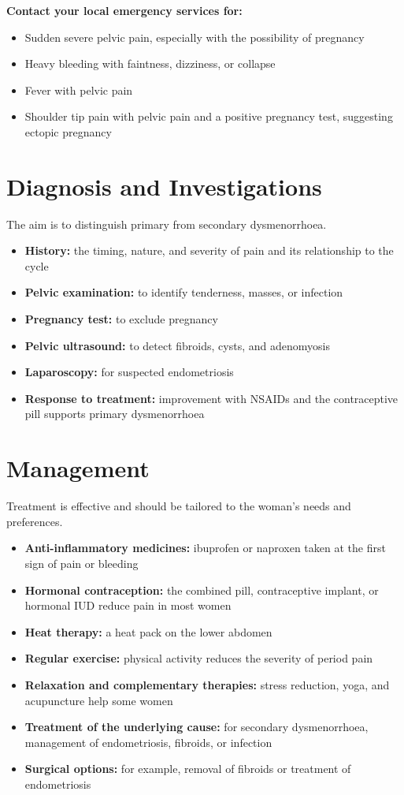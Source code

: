 \textbf{Contact your local emergency services for:}
\begin{itemize}
    \item Sudden severe pelvic pain, especially with the possibility of pregnancy
    \item Heavy bleeding with faintness, dizziness, or collapse
    \item Fever with pelvic pain
    \item Shoulder tip pain with pelvic pain and a positive pregnancy test, suggesting ectopic pregnancy
\end{itemize}

\section*{Diagnosis and Investigations}
The aim is to distinguish primary from secondary dysmenorrhoea.
\begin{itemize}
    \item \textbf{History:} the timing, nature, and severity of pain and its relationship to the cycle
    \item \textbf{Pelvic examination:} to identify tenderness, masses, or infection
    \item \textbf{Pregnancy test:} to exclude pregnancy
    \item \textbf{Pelvic ultrasound:} to detect fibroids, cysts, and adenomyosis
    \item \textbf{Laparoscopy:} for suspected endometriosis
    \item \textbf{Response to treatment:} improvement with NSAIDs and the contraceptive pill supports primary dysmenorrhoea
\end{itemize}

\section*{Management}
Treatment is effective and should be tailored to the woman's needs and preferences.
\begin{itemize}
    \item \textbf{Anti-inflammatory medicines:} ibuprofen or naproxen taken at the first sign of pain or bleeding
    \item \textbf{Hormonal contraception:} the combined pill, contraceptive implant, or hormonal IUD reduce pain in most women
    \item \textbf{Heat therapy:} a heat pack on the lower abdomen
    \item \textbf{Regular exercise:} physical activity reduces the severity of period pain
    \item \textbf{Relaxation and complementary therapies:} stress reduction, yoga, and acupuncture help some women
    \item \textbf{Treatment of the underlying cause:} for secondary dysmenorrhoea, management of endometriosis, fibroids, or infection
    \item \textbf{Surgical options:} for example, removal of fibroids or treatment of endometriosis
\end{itemize}

